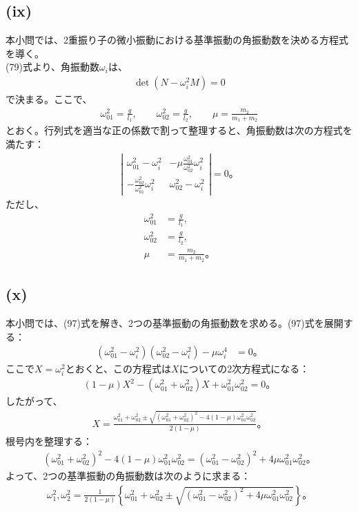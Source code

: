   \subsection*{(ix)}
  本小問では、2重振り子の微小振動における基準振動の角振動数を決める方程式を導く。\\
  (79)式より、角振動数$\omega_i$は、
  \begin{align*}
    \det(N-\omega_i^2M)=0
  \end{align*}
  で決まる。ここで、
  \begin{align*}
    \omega_{01}^2=\frac{g}{l_1},\qquad \omega_{02}^2=\frac{g}{l_2},\qquad \mu=\frac{m_2}{m_1+m_2}
  \end{align*}
  とおく。行列式を適当な正の係数で割って整理すると、角振動数は次の方程式を満たす：
  \begin{align*}
    \left|
    \begin{array}{cc}
      \omega_{01}^2-\omega_i^2 & -\mu\frac{\omega_{01}^2}{\omega_{02}^2}\omega_i^2\\
      -\frac{\omega_{02}^2}{\omega_{01}^2}\omega_i^2 & \omega_{02}^2-\omega_i^2
    \end{array}
    \right|=0。\tag{97}
  \end{align*}
  ただし、
  \begin{align*}
    \omega_{01}^2&=\frac{g}{l_1},\tag{98}\\
    \omega_{02}^2&=\frac{g}{l_2},\tag{99}\\
    \mu&=\frac{m_2}{m_1+m_2}。\tag{100}
  \end{align*}
  
  \subsection*{(x)}
  本小問では、(97)式を解き、2つの基準振動の角振動数を求める。(97)式を展開する：
  \begin{align*}
    (\omega_{01}^2-\omega_i^2)(\omega_{02}^2-\omega_i^2)-\mu\omega_i^4&=0。
  \end{align*}
  ここで$X=\omega_i^2$とおくと、この方程式は$X$についての2次方程式になる：
  \begin{align*}
    (1-\mu)X^2-(\omega_{01}^2+\omega_{02}^2)X+\omega_{01}^2\omega_{02}^2=0。
  \end{align*}
  したがって、
  \begin{align*}
    X
    =
    \frac{\omega_{01}^2+\omega_{02}^2\pm\sqrt{(\omega_{01}^2+\omega_{02}^2)^2-4(1-\mu)\omega_{01}^2\omega_{02}^2}}{2(1-\mu)}。
  \end{align*}
  根号内を整理する：
  \begin{align*}
    (\omega_{01}^2+\omega_{02}^2)^2-4(1-\mu)\omega_{01}^2\omega_{02}^2
    =
    (\omega_{01}^2-\omega_{02}^2)^2+4\mu\omega_{01}^2\omega_{02}^2。
  \end{align*}
  よって、2つの基準振動の角振動数は次のように求まる：
  \begin{align*}
    \omega_1^2,\omega_2^2
    =
    \frac{1}{2(1-\mu)}
    \left\{
      \omega_{01}^2+\omega_{02}^2
      \pm
      \sqrt{(\omega_{01}^2-\omega_{02}^2)^2+4\mu\omega_{01}^2\omega_{02}^2}
    \right\}。\tag{101}
  \end{align*}

